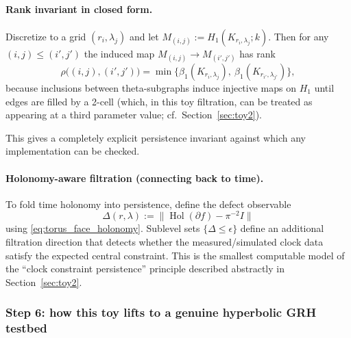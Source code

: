 \documentclass[11pt,oneside]{amsbook}
\numberwithin{equation}{section}
\theoremstyle{plain}
\theoremstyle{definition}
\theoremstyle{remark}
\DeclareMathOperator{\Hol}{\mathrm{Hol}}
\begin{document}
\paragraph{Rank invariant in closed form.}
Discretize to a grid $(r_i,\lambda_j)$ and let $M_{(i,j)}:=H_1(K_{r_i,\lambda_j};k)$.
Then for any $(i,j)\le (i',j')$ the induced map $M_{(i,j)}\to M_{(i',j')}$ has rank
\[
\rho\big((i,j),(i',j')\big)=\min\{\beta_1(K_{r_i,\lambda_j}),\ \beta_1(K_{r_{i'},\lambda_{j'}})\},
\]
because inclusions between theta-subgraphs induce injective maps on $H_1$ until edges are filled by a 2-cell (which, in this toy filtration, can be treated as appearing at a third parameter value; cf.\ Section~\ref{sec:toy2}).

This gives a completely explicit persistence invariant against which any implementation can be checked.

\paragraph{Holonomy-aware filtration (connecting back to time).}
To fold time holonomy into persistence, define the defect observable
\[
\Delta(r,\lambda):=\bigl\|\Hol(\partial f)-\pi^{-2}I\bigr\|
\]
using \eqref{eq:torus_face_holonomy}.
Sublevel sets $\{\Delta\le \epsilon\}$ define an additional filtration direction that detects whether the measured/simulated clock data satisfy the expected central constraint.
This is the smallest computable model of the ``clock constraint persistence'' principle described abstractly in Section~\ref{sec:toy2}.

\subsubsection{Step 6: how this toy lifts to a genuine hyperbolic GRH testbed}
\end{document}

